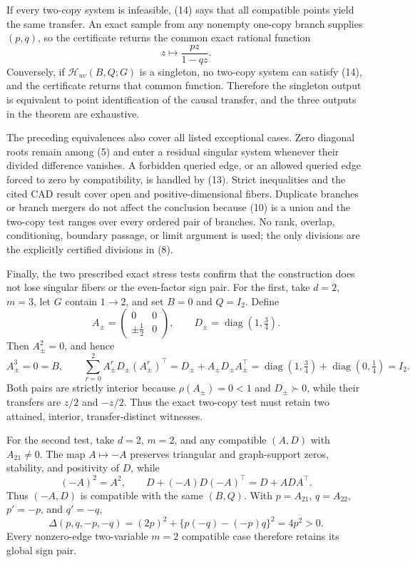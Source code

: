 If every two-copy system is infeasible, (14) says that all compatible points yield the same transfer.  An exact sample from any nonempty one-copy branch supplies \((p,q)\), so the certificate returns the common exact rational function
\[
 z\longmapsto\frac{pz}{1-qz}.
\]
Conversely, if \(\mathcal H_{uv}(B,Q;G)\) is a singleton, no two-copy system can satisfy (14), and the certificate returns that common function.  Therefore the singleton output is equivalent to point identification of the causal transfer, and the three outputs in the theorem are exhaustive.

The preceding equivalences also cover all listed exceptional cases.  Zero diagonal roots remain among (5) and enter a residual singular system whenever their divided difference vanishes.  A forbidden queried edge, or an allowed queried edge forced to zero by compatibility, is handled by (13).  Strict inequalities and the cited CAD result cover open and positive-dimensional fibers.  Duplicate branches or branch mergers do not affect the conclusion because (10) is a union and the two-copy test ranges over every ordered pair of branches.  No rank, overlap, conditioning, boundary passage, or limit argument is used; the only divisions are the explicitly certified divisions in (8).

Finally, the two prescribed exact stress tests confirm that the construction does not lose singular fibers or the even-factor sign pair.  For the first, take \(d=2\), \(m=3\), let \(G\) contain \(1\to2\), and set \(B=0\) and \(Q=I_2\).  Define
\[
 A_{\pm}=\begin{pmatrix}0&0\\ \pm\tfrac12&0\end{pmatrix},
 \qquad
 D_{\pm}=\operatorname{diag}\!\left(1,\tfrac34\right).
\]
Then \(A_{\pm}^2=0\), and hence
\[
 A_{\pm}^3=0=B,
 \qquad
 \sum_{r=0}^{2}A_{\pm}^rD_{\pm}(A_{\pm}^r)^\top
 =D_{\pm}+A_{\pm}D_{\pm}A_{\pm}^\top
 =\operatorname{diag}\!\left(1,\tfrac34\right)
  +\operatorname{diag}\!\left(0,\tfrac14\right)
 =I_2.
\]
Both pairs are strictly interior because \(\rho(A_{\pm})=0<1\) and \(D_{\pm}\succ0\), while their transfers are \(z/2\) and \(-z/2\).  Thus the exact two-copy test must retain two attained, interior, transfer-distinct witnesses.

For the second test, take \(d=2\), \(m=2\), and any compatible \((A,D)\) with \(A_{21}\ne0\).  The map \(A\mapsto-A\) preserves triangular and graph-support zeros, stability, and positivity of \(D\), while
\[
 (-A)^2=A^2,
 \qquad
 D+(-A)D(-A)^\top=D+ADA^\top.
\]
Thus \((-A,D)\) is compatible with the same \((B,Q)\).  With \(p=A_{21}\), \(q=A_{22}\), \(p'=-p\), and \(q'=-q\),
\[
 \Delta(p,q,-p,-q)
 =(2p)^2+\{p(-q)-(-p)q\}^2
 =4p^2>0.
\]
Every nonzero-edge two-variable \(m=2\) compatible case therefore retains its global sign pair.
